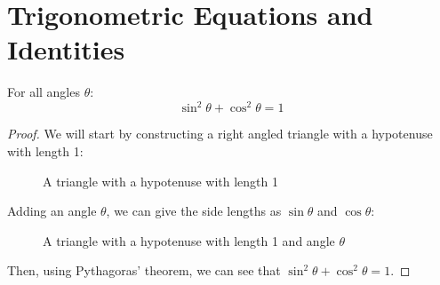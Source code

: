     \newpage

\section{Trigonometric Equations and Identities} \label{trigonometric_equations_and_inequalities}
    \begin{theorem}
        For all angles $\theta$:
        \begin{equation}
            \sin^2\theta+\cos^2\theta=1
        \end{equation}
    \end{theorem}
    \begin{proof}
        We will start by constructing a right angled triangle with a hypotenuse with length 1:
        \begin{figure}
            \begin{center}
                \caption{A triangle with a hypotenuse with length 1}
            \end{center}
        \end{figure}
        Adding an angle $\theta$, we can give the side lengths as $\sin\theta$ and $\cos\theta$:
        \begin{figure}
            \begin{center}
                \caption{A triangle with a hypotenuse with length 1 and angle $\theta$}
            \end{center}
        \end{figure}
        Then, using Pythagoras' theorem, we can see that $\sin^2\theta+\cos^2\theta=1$.
    \end{proof}
